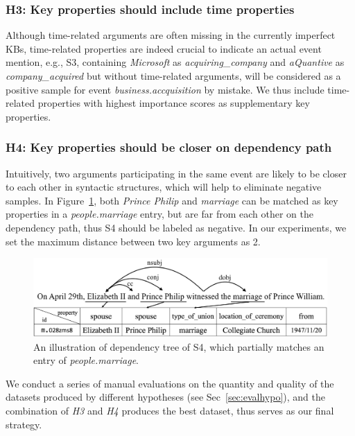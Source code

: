 \subsubsection{H3: Key properties should include time properties}
Although time-related arguments are often missing in the currently imperfect KBs, time-related properties are indeed
crucial to indicate an actual event mention, e.g., S3, containing  \emph{Microsoft} as \emph{acquiring\_company} and \emph{aQuantive} as \emph{company\_acquired} but without time-related arguments, will be considered as a positive sample for event \emph{business.accquisition} by mistake.
We thus include time-related properties with highest importance scores  as supplementary key properties. 

\subsubsection{H4: Key properties should be closer on dependency path}
Intuitively, two arguments participating in the same event are likely to be closer to each other in syntactic structures, which will help to eliminate negative samples. In Figure~\ref{fig:2},  both  \emph{Prince Philip} and \emph{marriage} can be matched as key properties in a \textit{people.marriage} entry,  but are far from each other on the dependency path, thus S4 should be labeled as negative.
In our experiments, we set the maximum distance between two key arguments as 2.

\begin{figure}
\centering
	\includegraphics[width=.47\textwidth]{deppath}
	\caption{An illustration of dependency tree of S4, which partially matches an entry of \emph{people.marriage}. \label{fig:2}}
\end{figure}

We conduct a series of manual evaluations on the quantity and quality of the 
 datasets produced by different hypotheses (see Sec~\ref{sec:evalhypo}), 
and the combination of  \emph{H3} and \emph{H4} produces the best dataset, thus serves 
as our final strategy.

